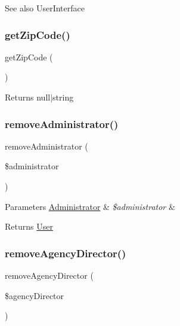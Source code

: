 \begin{DoxySeeAlso}{See also}
User\+Interface 
\end{DoxySeeAlso}
\mbox{\label{class_app_1_1_entity_1_1_user_a57a82c7e2cc6a5009844b8a9a9995e93}} 
\subsubsection{\texorpdfstring{getZipCode()}{getZipCode()}}
{\footnotesize\ttfamily get\+Zip\+Code (\begin{DoxyParamCaption}{ }\end{DoxyParamCaption})}

\begin{DoxyReturn}{Returns}
null$\vert$string 
\end{DoxyReturn}
\mbox{\label{class_app_1_1_entity_1_1_user_a38cf45790a7494be42e7db4797d8eff0}} 
\subsubsection{\texorpdfstring{removeAdministrator()}{removeAdministrator()}}
{\footnotesize\ttfamily remove\+Administrator (\begin{DoxyParamCaption}\item[{\mbox{\hyperlink{class_app_1_1_entity_1_1_administrator}{Administrator}}}]{\$administrator }\end{DoxyParamCaption})}


\begin{DoxyParams}[1]{Parameters}
\mbox{\hyperlink{class_app_1_1_entity_1_1_administrator}{Administrator}} & {\em \$administrator} & \\
\hline
\end{DoxyParams}
\begin{DoxyReturn}{Returns}
\mbox{\hyperlink{class_app_1_1_entity_1_1_user}{User}} 
\end{DoxyReturn}
\mbox{\label{class_app_1_1_entity_1_1_user_a3ddb9416b806067ad6d24d846a412b74}} 
\subsubsection{\texorpdfstring{removeAgencyDirector()}{removeAgencyDirector()}}
{\footnotesize\ttfamily remove\+Agency\+Director (\begin{DoxyParamCaption}\item[{\mbox{\hyperlink{class_app_1_1_entity_1_1_agency_director}{Agency\+Director}}}]{\$agency\+Director }\end{DoxyParamCaption})}


